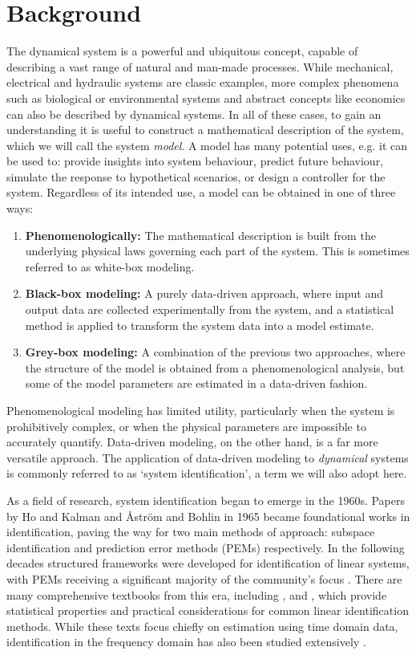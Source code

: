 \section{Background}

The dynamical system is a powerful and ubiquitous concept, capable of describing a vast range of natural and man-made processes. While mechanical, electrical and hydraulic systems are classic examples, more complex phenomena such as biological or environmental systems and abstract concepts like economics can also be described by dynamical systems. In all of these cases, to gain an understanding it is useful to construct a mathematical description of the system, which we will call the system \emph{model}. A model has many potential uses, e.g. it can be used to: provide insights into system behaviour, predict future behaviour, simulate the response to hypothetical scenarios, or design a controller for the system. Regardless of its intended use, a model can be obtained in one of three ways:
\begin{enumerate}
\item \textbf{Phenomenologically:} The mathematical description is built from the underlying physical laws governing each part of the system. This is sometimes referred to as white-box modeling.
\item \textbf{Black-box modeling:} A purely data-driven approach, where input and output data are collected experimentally from the system, and a statistical method is applied to transform the system data into a model estimate.
\item \textbf{Grey-box modeling:} A combination of the previous two approaches, where the structure of the model is obtained from a phenomenological analysis, but some of the model parameters are estimated in a data-driven fashion.
\end{enumerate}

Phenomenological modeling has limited utility, particularly when the system is prohibitively complex, or when the physical parameters are impossible to accurately quantify. Data-driven modeling, on the other hand, is a far more versatile approach. The application of data-driven modeling to \emph{dynamical} systems is commonly referred to as `system identification', a term we will also adopt here. 

As a field of research, system identification began to emerge in the 1960s. Papers by Ho and Kalman \cite{Ho1965} and {\AA}str{\"o}m and Bohlin \cite{Astrom1965} in 1965 became foundational works in identification, paving the way for two main methods of approach: subspace identification and prediction error methods (PEMs) respectively. In the following decades structured frameworks were developed for identification of linear systems, with PEMs receiving a significant majority of the community's focus \cite{Diestler2002}. There are many comprehensive textbooks from this era, including \cite{Goodwin1977}, \cite{Ljung1987} and \cite{Soderstrom1989}, which provide statistical properties and practical considerations for common linear identification methods. While these texts focus chiefly on estimation using time domain data, identification in the frequency domain has also been studied extensively \cite{Pintelon2012}.

